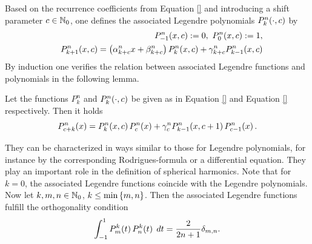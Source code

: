 Based on the recurrence coefficients from Equation \eqref{} and introducing a shift parameter $c \in \mathbb{N}_{0}$, one 
defines the associated Legendre polynomials $P_{k}^n{\hspace{-0.4ex}}\left(\cdot,c\right)$ by
\begin{eqnarray*}
  & & P_{-1}^n{\hspace{-0.4ex}}\left(x,c\right) := 0,\ P_{0}^n{\hspace{-0.4ex}}\left(x,c\right) := 1,\\
  & & P_{k+1}^n{\hspace{-0.4ex}}\left(x,c\right) = \left(\alpha_{k+c}^n x + \beta_{k+c}^n\right) P_{k}^n{\hspace{-0.4ex}}\left(x,c\right) + \gamma_{k+c}^n P_{k-1}^n{\hspace{-0.4ex}}\left(x,c\right)
\end{eqnarray*}
By induction one verifies the relation between associated Legendre functions and polynomials in the following lemma.
\begin{lemma}
  Let the functions $P_{k}^n$ and $P_{k}^n{\hspace{-0.4ex}}\left(\cdot,c\right)$ be given as in Equation \eqref{} and 
  Equation \eqref{} respectively. Then it holds
  $$ P_{c+k}^n{\hspace{-0.4ex}}\left(x\right) = P_{k}^n{\hspace{-0.4ex}}\left(x,c\right) P_{c}^n{\hspace{-0.4ex}}\left(x\right) + \gamma_{c}^n P_{k-1}^n{\hspace{-0.4ex}}\left(x,c+1\right) P_{c-1}^n{\hspace{-0.4ex}}\left(x\right). $$
\end{lemma}

\newpage

They can be characterized in ways similar
to those for Legendre polynomials, for instance by the
corresponding Rodrigues-formula or a differential equation. They
play an important role in the definition of spherical harmonics.
Note that for $k = 0$, the associated Legendre functions coincide with 
the Legendre polynomials.
Now let $k,m,n \in \mathbb{N}_0$, $k \le \min\left\{m,n\right\}$. Then the associated
Legendre functions fulfill the orthogonality condition
\begin{equation}
\nonumber
  \int_{-1}^{1} P_{m}^{k}{\hspace{-0.4ex}}\left(t\right) P_{n}^{k}{\hspace{-0.4ex}}\left(t\right)\;dt =
  \frac{2}{2n+1}\delta_{m,n}.
\end{equation}



